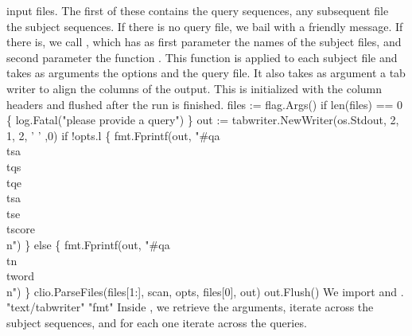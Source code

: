 input files. The first of these contains the query sequences, any
subsequent file the subject sequences. If there is no query file, we
bail with a friendly message. If there is, we call ,
which has as first parameter the names of the subject files, and
second parameter the function . This function is applied to
each subject file and takes as arguments the options and the query
file. It also takes as argument a tab writer to align the columns of
the output. This is initialized with the column headers and flushed
after the run is finished.
\nwenddocs{}\endmoddef\nwstartdeflinemarkup{}\nwenddeflinemarkup
files := flag.Args()
if len(files) == 0 \{
          log.Fatal("please provide a query")
\}
out := tabwriter.NewWriter(os.Stdout, 2, 1, 2, ' ' ,0)
if !opts.l \{
          fmt.Fprintf(out, "#qa\\tsa\\tqs\\tqe\\tsa\\tse\\tscore\\n")
\} else \{
          fmt.Fprintf(out, "#qa\\tn\\tword\\n")
\}
clio.ParseFiles(files[1:], scan, opts, files[0], out)
out.Flush()
\nwendcode{}\nwdocspar
We import  and .
\nwenddocs{}\plusendmoddef\nwstartdeflinemarkup{}\nwenddeflinemarkup
"text/tabwriter"
"fmt"
\nwendcode{}\nwdocspar
Inside , we retrieve the arguments, iterate across the
subject sequences, and for each one iterate across the queries.
\nwenddocs{}\endmoddef\nwstartdeflinemarkup{}\nwenddeflinemarkup
